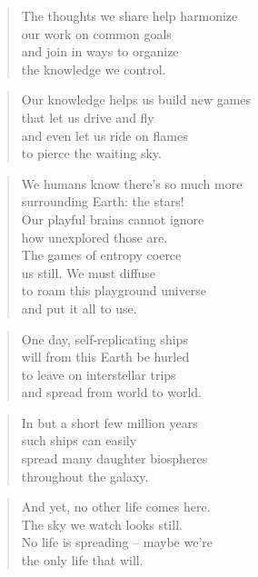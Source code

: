 \documentclass[10pt,a4paper]{article}
\begin{document}
\begin{paracol}{2}
\begin{verse}
The thoughts we share help harmonize\\
our work on common goals\\
and join in ways to organize\\
the knowledge we control.
\end{verse}

\begin{verse}
Our knowledge helps us build new games\\
that let us drive and fly\\
and even let us ride on flames\\
to pierce the waiting sky.
\end{verse}

\begin{verse}
We humans know there’s so much more\\
surrounding Earth: the stars!\\
Our playful brains cannot ignore\\
how unexplored those are.
\\
The games of entropy coerce\\
us still. We must diffuse\\
to roam this playground universe\\
and put it all to use.
\end{verse}

\begin{verse}
One day, self-replicating ships\\
will from this Earth be hurled\\
to leave on interstellar trips\\
and spread from world to world.
\end{verse}

\begin{verse}
In but a short few million years\\
such ships can easily\\
spread many daughter biospheres\\
throughout the galaxy.
\end{verse}

\begin{verse}
And yet, no other life comes here.\\
The sky we watch looks still.\\
No life is spreading – maybe we’re\\
the only life that will.
\end{verse}


\end{paracol}
\end{document}
